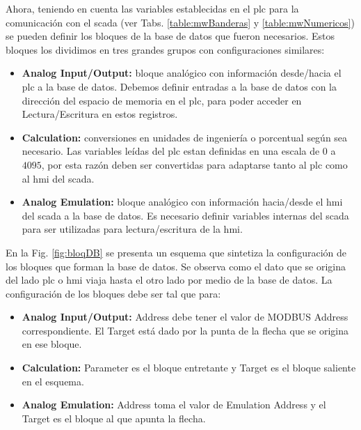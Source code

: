 Ahora, teniendo en cuenta las variables establecidas en el \gls{plc} 
para la comunicación con el \gls{scada} (ver 
Tabs. \ref{table:mwBanderas} y
\ref{table:mwNumericos}) se pueden definir los bloques de la base
de datos que fueron necesarios. Estos bloques los dividimos en tres
grandes grupos con configuraciones similares:
 
\begin{itemize}
 \item \textbf{Analog Input/Output:} bloque analógico con información 
desde/hacia el 
  \gls{plc} a la base de datos. Debemos definir entradas a la base de datos con 
  la dirección del espacio de memoria en el \gls{plc}, para poder acceder en
  Lectura/Escritura en estos registros.
 \item \textbf{Calculation:}  conversiones en unidades de ingeniería o
porcentual
  según sea necesario. Las variables leídas del \gls{plc} estan definidas en 
  una escala de $0$ a $4095$, por esta razón deben ser convertidas para
adaptarse tanto al \gls{plc} como al \gls{hmi} del \gls{scada}.
 \item \textbf{Analog Emulation:} bloque analógico con información hacia/desde
el
  \gls{hmi} del \gls{scada} a la base de datos. Es necesario definir variables 
  internas del \gls{scada} para ser utilizadas para lectura/escritura de la 
  \gls{hmi}.
\end{itemize}

En la Fig. \ref{fig:bloqDB} se presenta un esquema que sintetiza la
configuración de los bloques que forman la base de datos. Se observa
como el dato que se origina del lado \gls{plc} o \gls{hmi} viaja hasta el otro 
lado por medio de la base de datos. La configuración de los bloques debe ser tal 
que para:

\begin{itemize}
  \item \textbf{Analog Input/Output:} Address debe tener el valor de MODBUS
  Address correspondiente. El Target está dado por la punta de la flecha que se
  origina en ese bloque.
  \item \textbf{Calculation:} Parameter es el bloque entretante y Target es el
  bloque saliente en el esquema.
  \item \textbf{Analog Emulation:} Address toma el valor de Emulation Address y
  el Target es el bloque al que apunta la flecha. 
\end{itemize}



